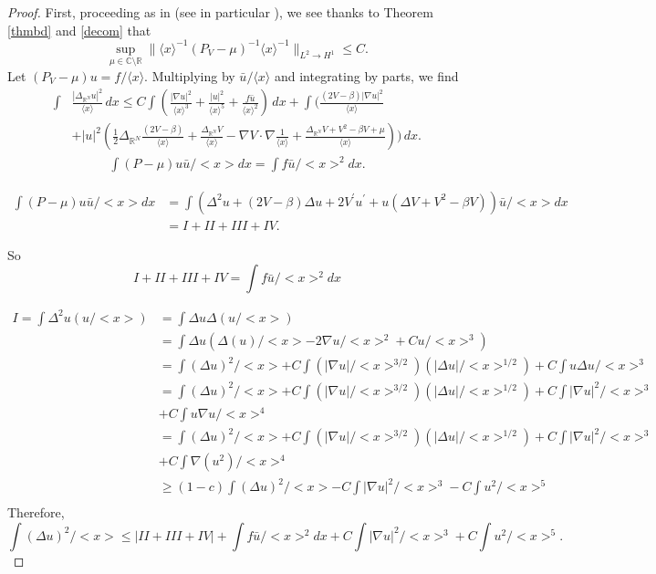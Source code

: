 \documentclass[10pt,leqno]{amsart}
\numberwithin{equation}{section}
\newcommand{\field}[1]{\mathbb{#1}}
\newcommand{\R}{\field{R}}          		%
\begin{document}
\begin{proof}
First, proceeding as in \cite{BaDyweight} (see in particular \cite[(57)]{BaDyweight}), we see thanks to Theorem \ref{thmbd} and  \eqref{decom} that 
$$\sup_{\mu \in \mathbb{C} \setminus \R} \big\| \langle x\rangle ^{-1}  (P_V -\mu)^{-1} \langle x\rangle ^{-1} \big\|_{L^2 \rightarrow H^1}\leq C. $$
Let $(P_V-\mu) u= f/\langle x\rangle$.
 Multiplying by $\bar{u}/\langle x\rangle$ and integrating by parts, we find
\begin{align*}
\int &\frac{|\Delta_{\R^N} u|^2}{\langle x\rangle}\,dx \leq C \int \left(\frac{|\nabla u|^2}{\langle x\rangle^3} + \frac{|u|^2}{\langle x\rangle^5} + \frac{f\bar{u}}{\langle x\rangle^2}\right)\,dx 
+  \int \bigg(\frac{(2V-\beta) |\nabla u|^2}{\langle x\rangle}
\\
& 
+ |u|^2 \left(\frac{1}{2} \Delta_{\R^N}\frac{(2V-\beta)}{\langle x\rangle} + \frac{\Delta_{\R^N} V}{\langle x \rangle} - \nabla V \cdot\nabla \frac{1}{\langle x\rangle}+\frac{\Delta_{\R^N} V +V^2 - \beta V +\mu }{\langle x\rangle} \right)\bigg)\,dx.
\end{align*}
\iffalse
\begin{align*}
\int (P-\mu) u \bar{u} /<x> dx = \int f \bar{u} /<x>^2  dx.
\end{align*}


\begin{align*}
\int (P-\mu) u \bar{u} /<x> dx &= \int (\Delta^2 u+(2V-\beta) \Delta u +2V^\prime u^\prime +u (\Delta V+V^2 - \beta V) ) \bar{u} /<x>  dx\\
&=I+II+III+IV.
\end{align*}

So
$$I+II+III+IV = \int f \bar{u} /<x>^2  dx$$



\begin{align*}
I=\int \Delta^2 u (u/<x>) &= \int \Delta u \Delta (u/<x>)\\
&= \int \Delta u ( \Delta (u)/<x> -2 \nabla u /<x>^{2} +C u /<x>^3)\\
&= \int (\Delta u)^2 /<x> + C \int (|\nabla u|/<x>^{3/2})( |\Delta u| /<x>^{1/2}) +C\int u \Delta u /<x>^3 \\
& =\int (\Delta u)^2 /<x> +  C \int (|\nabla u|/<x>^{3/2})( |\Delta u| /<x>^{1/2})  +C\int |\nabla u|^2 /<x>^3 \\
& +C\int u\nabla u / <x>^4 \\
&=\int (\Delta u)^2 /<x> +  C \int (|\nabla u|/<x>^{3/2})( |\Delta u| /<x>^{1/2})  +C\int |\nabla u|^2 /<x>^3 \\
& +C\int \nabla (u^2) / <x>^4 \\
&\geq (1- c)\int (\Delta u)^2 /<x> - C\int |\nabla u|^2 /<x>^3 -C \int u^2 / <x>^5 \\
\end{align*}
Therefore,
$$\int (\Delta u)^2 /<x>  \leq  |II+III+IV| + \int f \bar{u} /<x>^2  dx + C\int |\nabla u|^2 /<x>^3 +C \int u^2 / <x>^5.$$


\end{proof}
\end{document}
